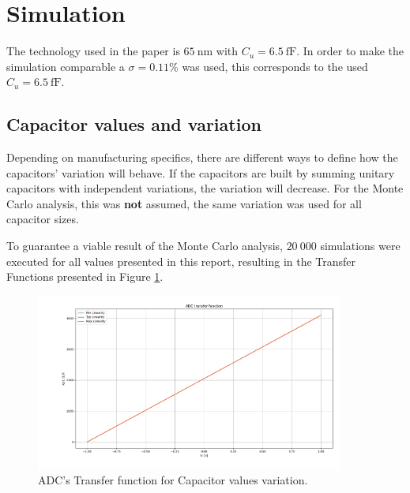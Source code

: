 \section{Simulation}
\label{sec:simulation}

The technology used in the paper is $\SI{65}{\nano\meter}$ with $C_u = \SI{6.5}{\femto\farad}$. In order to make the simulation comparable a $\sigma = 0.11\%$ was used, this corresponds to the used $C_u = \SI{6.5}{\femto\farad}$.


\subsection{Capacitor values and variation}

Depending on manufacturing specifics, there are different ways to define how the capacitors' variation will behave. If the capacitors are built by summing unitary capacitors with independent variations, the variation will decrease. For the Monte Carlo analysis, this was \textbf{not} assumed, the same variation was used for all capacitor sizes.

To guarantee a viable result of the Monte Carlo analysis, $20~000$ simulations were executed for all values presented in this report, resulting in the Transfer Functions presented in Figure \ref{fig:ADC_TF_ALLCAPS}.

\begin{figure}[H]

    \centering
    \includegraphics*[width=0.9\textwidth]{Images/ADC_TransFunc_All_Caps_20Ksim_s0011.png}
    \caption{ADC's Transfer function for Capacitor values variation.}

    \label{fig:ADC_TF_ALLCAPS}
\end{figure}

